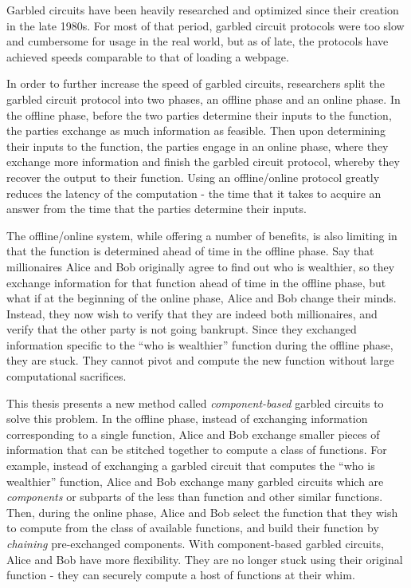 Garbled circuits have been heavily researched and optimized since their creation in the late 1980s.
For most of that period, garbled circuit protocols were too slow and cumbersome for usage in the real world, but as of late, the protocols have achieved speeds comparable to that of loading a webpage. 

In order to further increase the speed of garbled circuits, researchers split the garbled circuit protocol into two phases, an offline phase and an online phase.
In the offline phase, before the two parties determine their inputs to the function, the parties exchange as much information as feasible. 
Then upon determining their inputs to the function, the parties engage in an online phase, where they exchange more information and finish the garbled circuit protocol, whereby they recover the output to their function.
Using an offline/online protocol greatly reduces the latency of the computation - the time that it takes to acquire an answer from the time that the parties determine their inputs.

The offline/online system, while offering a number of benefits, is also limiting in that the function is determined ahead of time in the offline phase.
Say that millionaires Alice and Bob originally agree to find out who is wealthier, so they exchange information for that function ahead of time in the offline phase, but what if at the beginning of the online phase, Alice and Bob change their minds. 
Instead, they now wish to verify that they are indeed both millionaires, and verify that the other party is not going bankrupt.
Since they exchanged information specific to the ``who is wealthier'' function during the offline phase, they are stuck. 
They cannot pivot and compute the new function without large computational sacrifices.

This thesis presents a new method called \textit{component-based} garbled circuits to solve this problem.
In the offline phase, instead of exchanging information corresponding to a single function, Alice and Bob exchange smaller pieces of information that can be stitched together to compute a class of functions.
For example, instead of exchanging a garbled circuit that computes the ``who is wealthier'' function, Alice and Bob exchange many garbled circuits which are \textit{components} or subparts of the less than function and other similar functions.
Then, during the online phase, Alice and Bob select the function that they wish to compute from the class of available functions, and build their function by \textit{chaining} pre-exchanged components.
With component-based garbled circuits, Alice and Bob have more flexibility. 
They are no longer stuck using their original function - they can securely compute a host of functions at their whim. 

